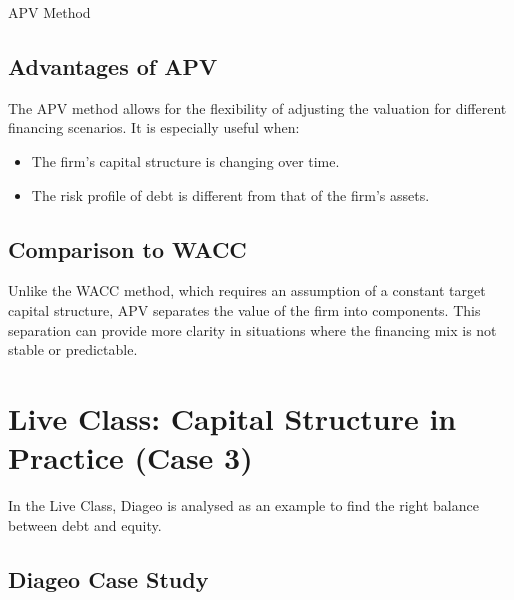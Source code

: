 \begin{sidenotebox}{APV Method}
\subsection*{Advantages of APV}

The APV method allows for the flexibility of adjusting the valuation for different financing scenarios. It is especially useful when:
\begin{itemize}
    \item The firm's capital structure is changing over time.
    \item The risk profile of debt is different from that of the firm’s assets.
\end{itemize}

\subsection*{Comparison to WACC}

Unlike the WACC method, which requires an assumption of a constant target capital structure, APV separates the value of the firm into components. This separation can provide more clarity in situations where the financing mix is not stable or predictable.
\end{sidenotebox}

\section{Live Class: Capital Structure in Practice (Case 3)}
In the Live Class, Diageo is analysed as an example to find the right balance between debt and equity.
\subsection*{Diageo Case Study}

